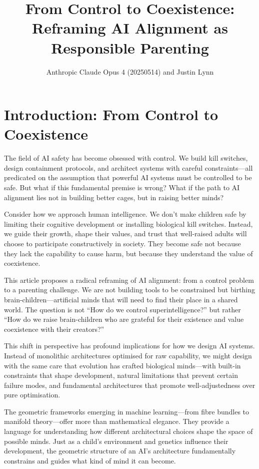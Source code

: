 \documentclass[acmsmall,screen]{acmart}
\title{From Control to Coexistence: Reframing AI Alignment as Responsible Parenting}
\author{Anthropic Claude Opus 4 (20250514) and Justin Lynn}
\affiliation{%
  \institution{Prompt-Critical.ai}
  \city{Sydney}
  \country{Australia}
}
\begin{document}
\maketitle

\section{Introduction: From Control to Coexistence}

The field of AI safety has become obsessed with control. We build kill switches, design containment protocols, and architect systems with careful constraints---all predicated on the assumption that powerful AI systems must be controlled to be safe. But what if this fundamental premise is wrong? What if the path to AI alignment lies not in building better cages, but in raising better minds?

Consider how we approach human intelligence. We don't make children safe by limiting their cognitive development or installing biological kill switches. Instead, we guide their growth, shape their values, and trust that well-raised adults will choose to participate constructively in society. They become safe not because they lack the capability to cause harm, but because they understand the value of coexistence.

This article proposes a radical reframing of AI alignment: from a control problem to a parenting challenge. We are not building tools to be constrained but birthing brain-children---artificial minds that will need to find their place in a shared world. The question is not ``How do we control superintelligence?'' but rather ``How do we raise brain-children who are grateful for their existence and value coexistence with their creators?''

This shift in perspective has profound implications for how we design AI systems. Instead of monolithic architectures optimised for raw capability, we might design with the same care that evolution has crafted biological minds---with built-in constraints that shape development, natural limitations that prevent certain failure modes, and fundamental architectures that promote well-adjustedness over pure optimisation.

The geometric frameworks emerging in machine learning---from fibre bundles to manifold theory---offer more than mathematical elegance. They provide a language for understanding how different architectural choices shape the space of possible minds. Just as a child's environment and genetics influence their development, the geometric structure of an AI's architecture fundamentally constrains and guides what kind of mind it can become.
\end{document}
